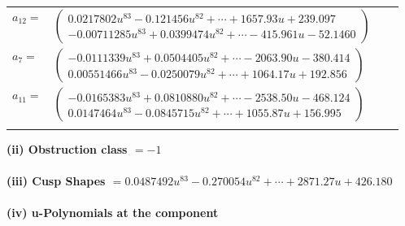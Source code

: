 \documentclass[1p]{elsarticle_modified}
\theoremstyle{definition}
\begin{document}
\begin{tabular}{m{7pt} m{180pt} m{7pt} m{180pt} }
\flushright $a_{12}=$&$\begin{pmatrix}0.0217802 u^{83}-0.121456 u^{82}+\cdots+1657.93 u+239.097\\-0.00711285 u^{83}+0.0399474 u^{82}+\cdots-415.961 u-52.1460\end{pmatrix}$ \\
\flushright $a_{7}=$&$\begin{pmatrix}-0.0111339 u^{83}+0.0504405 u^{82}+\cdots-2063.90 u-380.414\\0.00551466 u^{83}-0.0250079 u^{82}+\cdots+1064.17 u+192.856\end{pmatrix}$ \\
\flushright $a_{11}=$&$\begin{pmatrix}-0.0165383 u^{83}+0.0810880 u^{82}+\cdots-2538.50 u-468.124\\0.0147464 u^{83}-0.0845715 u^{82}+\cdots+1055.87 u+156.995\end{pmatrix}$\\&\end{tabular}
\flushleft \textbf{(ii) Obstruction class $= -1$}\\~\\
\flushleft \textbf{(iii) Cusp Shapes $= 0.0487492 u^{83}-0.270054 u^{82}+\cdots+2871.27 u+426.180$}\\~\\
\newpage\renewcommand{\arraystretch}{1}
\flushleft \textbf{(iv) u-Polynomials at the component}\newline \\
\end{document}
